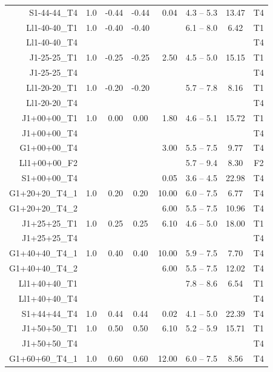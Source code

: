\begin{table}
\begin{tabular}{@{}rrrcrrcc}
S1-44-44\_T4 & 1.0  &  -0.44  &  -0.44  &  0.04  &   4.3 -- 5.3  &  13.47  &  T4 
\\
Ll1-40-40\_T1 & 1.0  &  -0.40  &  -0.40  &    &   6.1 -- 8.0  &  6.42  & T1\\
Ll1-40-40\_T4 & & & & & & & T4 \\
J1-25-25\_T1 & 1.0  &  -0.25  &  -0.25  &  2.50  &   4.5 -- 5.0  &  15.15  & 
T1\\
J1-25-25\_T4 & & & & & & & T4 \\
Ll1-20-20\_T1 & 1.0  &  -0.20  &  -0.20  &    &   5.7 -- 7.8  &  8.16  & T1\\
Ll1-20-20\_T4 & & & & & & & T4 \\
J1+00+00\_T1 & 1.0  &  0.00  &  0.00  &  1.80  &   4.6 -- 5.1  &  15.72  & T1\\
J1+00+00\_T4 & & & & & & & T4 \\
G1+00+00\_T4 &   &    &    &  3.00  &  5.5 -- 7.5  &  9.77  &  T4 \\
Ll1+00+00\_F2 &   &    &    &    &  5.7 -- 9.4  &  8.30  &  F2 \\
S1+00+00\_T4 &   &    &    &  0.05  &  3.6 -- 4.5  &  22.98  &  T4 \\
G1+20+20\_T4\_1 & 1.0  &  0.20  &  0.20  &  10.00  &   6.0 -- 7.5  &   6.77  &  
T4 \\ %
G1+20+20\_T4\_2 &      &        &        &   6.00  &   5.5 -- 7.5  &  10.96  &  
T4 \\ %
J1+25+25\_T1 & 1.0  &  0.25  &  0.25  &  6.10  &   4.6 -- 5.0  &  18.00  & T1\\
J1+25+25\_T4 & & & & & & & T4 \\
G1+40+40\_T4\_1 & 1.0  &  0.40  &  0.40  &  10.00  &   5.9 -- 7.5  &   7.70  &  
T4 \\ %
G1+40+40\_T4\_2 &      &        &        &   6.00  &   5.5 -- 7.5  &  12.02  &  
T4 \\ %
Ll1+40+40\_T1 &   &    &    &    &  7.8 -- 8.6  &  6.54  & T1\\
Ll1+40+40\_T4 & & & & & & & T4 \\
S1+44+44\_T4 & 1.0  &  0.44  &  0.44  &  0.02  &   4.1 -- 5.0  &  22.39  &  T4 
\\
J1+50+50\_T1 & 1.0  &  0.50  &  0.50  &  6.10  &   5.2 -- 5.9  &  15.71  & T1\\
J1+50+50\_T4 & & & & & & & T4 \\
G1+60+60\_T4\_1 & 1.0  &  0.60  &  0.60  &  12.00  &   6.0 -- 7.5  & 8.56  &  T4 

\end{tabular}
\end{table}
